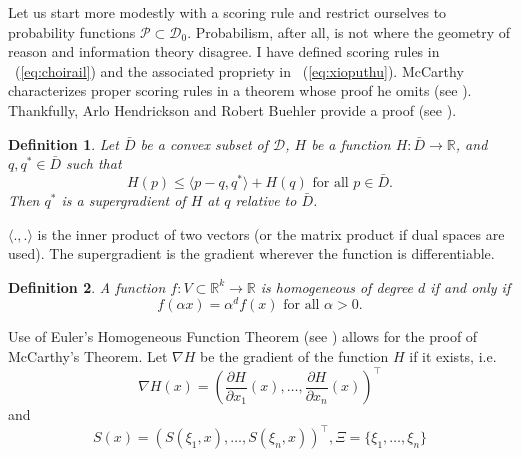 \documentclass[12pt]{article}
\newtheorem{definition}{Definition}[section]
\begin{document}
Let us start more modestly with a scoring rule and restrict ourselves
to probability functions $\mathcal{P}\subset\mathcal{D}_{0}$.
Probabilism, after all, is not where the geometry of reason and
information theory disagree.
I have defined scoring rules in {\quation}~(\ref{eq:choirail}) and the
associated propriety in {\quation}~(\ref{eq:xioputhu}). McCarthy
characterizes proper scoring rules in a theorem whose proof he omits
(see ). Thankfully, Arlo Hendrickson and
Robert Buehler provide a proof (see
).

\begin{definition}
  \label{def:yahjoith}
  Let $\bar{D}$ be a convex subset of $\mathcal{D}$, $H$ be a function
  $H:\bar{D}\rightarrow\mathbb{R}$, and $q,q^{\ast}\in{}\bar{D}$ such that
  \begin{equation}
    \label{eq:fooceiya}
    H(p)\leq\langle{}p-q,q^{\ast}\rangle+H(q)\mbox{ for all }p\in{}\bar{D}.
  \end{equation}
Then $q^{\ast}$ is a supergradient of $H$ at $q$ relative to $\bar{D}$. 
\end{definition}

$\langle{}.,.\rangle$ is the inner product of two vectors (or the
matrix product if dual spaces are used). The supergradient is the
gradient wherever the function is differentiable.

\begin{definition}
  \label{def:ahthaive}
  A function $f:V\subset\mathbb{R}^{k}\rightarrow\mathbb{R}$ is
  homogeneous of degree $d$ if and only if
  \begin{equation}
    \label{eq:ooveighe}
    f(\alpha{}x)=\alpha^{d}f(x)\mbox{ for all }\alpha>0.
  \end{equation}
\end{definition}

Use of Euler's Homogeneous Function Theorem (see
) allows for the proof of McCarthy's Theorem.
Let $\nabla{}H$ be the gradient of the function $H$ if it exists, i.e.
\begin{equation}
  \label{eq:ailaekoi}
  \nabla{}H(x)=\left(\frac{\partial{}H}{\partial{}x_{1}}(x),{\ldots},\frac{\partial{}H}{\partial{}x_{n}}(x)\right)^{\intercal}
\end{equation}
and
\begin{equation}
  \label{eq:ahphaete}
  S(x)=\left(S(\xi_{1},x),{\ldots},S(\xi_{n},x)\right)^{\intercal},\Xi=\{\xi_{1},{\ldots},\xi_{n}\}
\end{equation}
\end{document}

